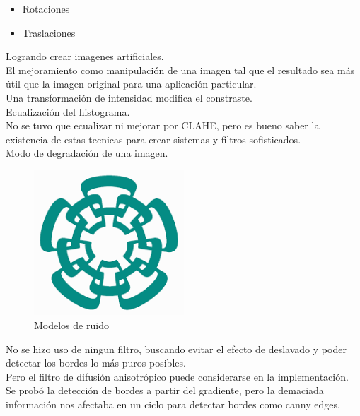 \documentclass[a4paper, 11pt]{article}
\begin{document}
\begin{itemize}
\item Rotaciones
\item Traslaciones
\end{itemize}

Logrando crear imagenes artificiales.\\


El mejoramiento como manipulación de una imagen tal que el resultado sea más útil que la imagen original para una aplicación particular.\\

Una transformación de intensidad modifica el constraste.\\

Ecualización del histograma.\\

No se tuvo que ecualizar ni mejorar por CLAHE, pero es bueno saber la existencia de estas tecnicas para crear sistemas y filtros sofisticados.\\

Modo de degradación de una imagen.\\

\begin{figure}[h]
\centering
\includegraphics[width=0.5\textwidth]{cinves}
\caption{Modelos de ruido}
\end{figure}

No se hizo uso de ningun filtro, buscando evitar el efecto de deslavado y poder detectar los bordes lo más puros posibles.\\

Pero el filtro de difusión anisotrópico puede considerarse en la implementación.\\

Se probó la detección de bordes a partir del gradiente, pero la demaciada información nos afectaba en un ciclo para detectar bordes como canny edges.\\
\end{document}

